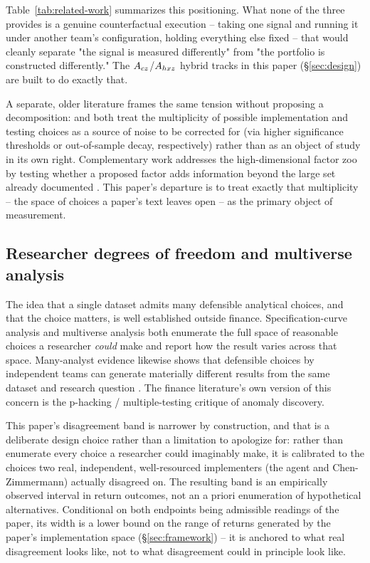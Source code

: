 Table~\ref{tab:related-work} summarizes this positioning. What none of the
three provides is a genuine counterfactual execution -- taking one signal
and running it under another team's configuration, holding everything else
fixed -- that would cleanly separate "the signal is measured differently"
from "the portfolio is constructed differently." The $A_{cz}$/$A_{hxz}$ hybrid
tracks in this paper (\S\ref{sec:design}) are built to do exactly that.



A separate, older literature frames the same tension without proposing a
decomposition: \citet{HarveyLiuZhu2016} and \citet{McLeanPontiff2016}
both treat the multiplicity of possible implementation and testing choices
as a source of noise to be corrected for (via higher significance
thresholds or out-of-sample decay, respectively) rather than as an object of
study in its own right. Complementary work addresses the high-dimensional
factor zoo by testing whether a proposed factor adds information beyond the
large set already documented \citep{FengGiglioXiu2020}. This paper's departure
is to treat exactly that
multiplicity -- the space of choices a paper's text leaves open -- as the
primary object of measurement.

\subsection{Researcher degrees of freedom and multiverse analysis}

The idea that a single dataset admits many defensible analytical choices,
and that the choice matters, is well established outside finance.
Specification-curve analysis \citep{Simonsohn2020} and
multiverse analysis \citep{Steegen2016} both enumerate the full space of
reasonable choices a researcher \emph{could} make and report how the result
varies across that space. Many-analyst evidence likewise shows that defensible
choices by independent teams can generate materially different results from
the same dataset and research question \citep{SilberzahnEtAl2018}. The finance
literature's own version of this concern is the p-hacking / multiple-testing
critique of anomaly discovery.

This paper's disagreement band is narrower by construction, and that is a
deliberate design choice rather than a limitation to apologize for: rather
than enumerate every choice a researcher could imaginably make, it is
calibrated to the choices two real, independent, well-resourced
implementers (the agent and Chen-Zimmermann) actually disagreed on. The
resulting band is an empirically observed interval in return outcomes, not an
a priori enumeration of hypothetical alternatives. Conditional on both
endpoints being admissible readings of the paper, its width is a lower bound
on the range of returns generated by the paper's implementation space
(\S\ref{sec:framework}) -- it is anchored to what real disagreement looks
like, not to what disagreement could in principle look like.

